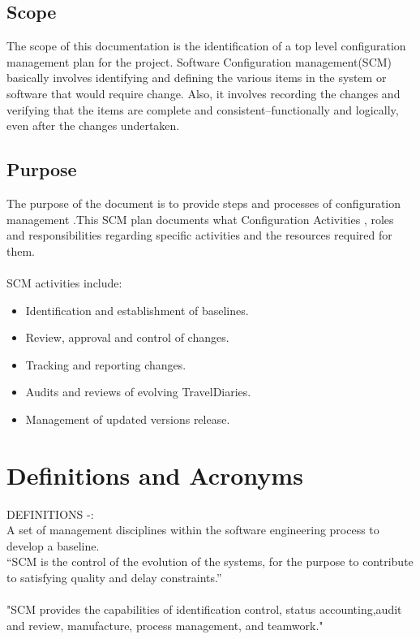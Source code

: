 \documentclass[]{article}
\begin{document}
\subsection{Scope}
The scope of this documentation is the identification of a top ­level configuration management plan for the project. Software Configuration management(SCM) basically involves identifying and defining the various items in the system or software that would require change. Also, it involves recording the changes and verifying that the items are complete and consistent–functionally and logically, even after the changes undertaken.


\subsection{Purpose}
The purpose of the document is to provide steps and processes of configuration management .This SCM plan documents what Configuration Activities , roles and responsibilities regarding specific activities and the resources required for them.\\\\
SCM activities include​:
\begin{itemize}

\item Identification and establishment of baselines.
\item Review, approval and control of changes.
\item Tracking and reporting changes.
\item Audits and reviews of evolving TravelDiaries.
\item Management of updated versions release.

\end{itemize}

\section{Definitions and Acronyms}

DEFINITIONS -:\\

A set of management disciplines within the software engineering process
to develop a baseline.\\
“SCM is the control of the evolution of the systems, for the purpose to contribute to 
satisfying quality and delay constraints.”
\\\\
"SCM provides the capabilities of identification control, status accounting,audit and review, manufacture, process management, and teamwork."
\end{document}
